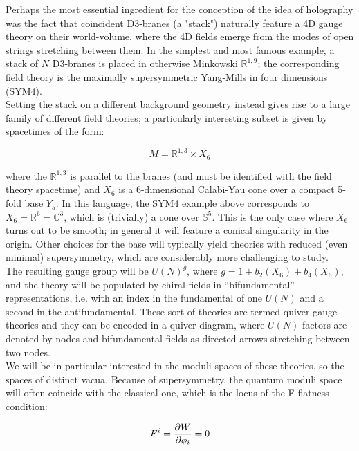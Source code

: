

Perhaps the most essential ingredient for the conception of the idea of holography was the fact that coincident D3-branes (a "stack") naturally feature a 4D gauge theory on their world-volume, where the 4D fields emerge from the modes of open strings stretching between them. In the simplest and most famous example, a stack of $N$ D3-branes is placed in otherwise Minkowski $\mathbb{R}^{1,9}$; the corresponding field theory is the maximally supersymmetric Yang-Mills in four dimensions (SYM4).\\

Setting the stack on a different background geometry instead gives rise to a large family of different field theories; a particularly interesting subset is given by spacetimes of the form:

\begin{equation} 
	M = \mathbb{R}^{1,3} \times X_6 
\end{equation}

where the $\mathbb{R}^{1,3}$ is parallel to the branes (and must be identified with the field theory spacetime) and $X_6$ is a 6-dimensional Calabi-Yau cone over a compact 5-fold base $Y_5$. In this language, the SYM4 example above corresponds to $X_6 = \mathbb{R}^6 = \mathbb{C}^3$, which is (trivially) a cone over $\mathbb{S}^5$. This is the only case where $X_6$ turns out to be smooth; in general it will feature a conical singularity in the origin. Other choices for the base will typically yield theories with reduced (even minimal) supersymmetry, which are considerably more challenging to study.\\

The resulting gauge group will be $U(N)^g$, where $g = 1 + b_2(X_6) + b_4(X_6)$, and the theory will be populated by chiral fields in ``bifundamental'' representations, i.e. with an index in the fundamental of one $U(N)$ and a second in the antifundamental. These sort of theories are termed quiver gauge theories and they can be encoded in a quiver diagram, where $U(N)$ factors are denoted by nodes and bifundamental fields as directed arrows stretching between two nodes.\\

We will be in particular interested in the moduli spaces of these theories, so the spaces of distinct vacua. Because of supersymmetry, the quantum moduli space will often coincide with the classical one, which is the locus of the F-flatness condition:

\begin{equation}
	F^i = \frac{\partial W}{\partial\phi_i} = 0
	\label{}
\end{equation}

